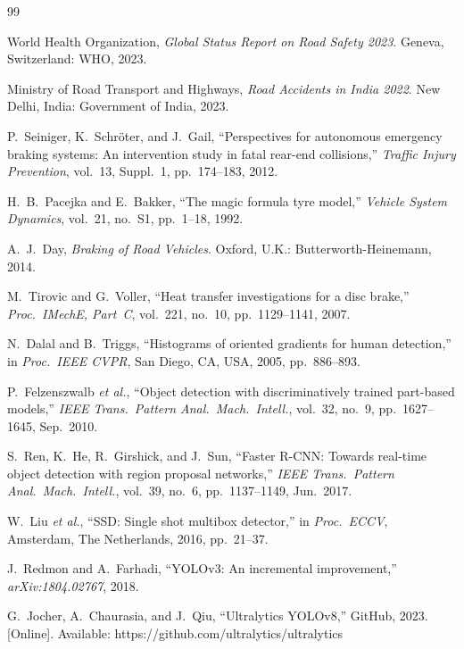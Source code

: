 \documentclass[journal]{IEEEtran}
\newcommand{\etal}{\textit{et al.}}
\begin{document}
\begin{thebibliography}{99}

World Health Organization, \textit{Global Status Report on Road Safety
2023}. Geneva, Switzerland: WHO, 2023.

Ministry of Road Transport and Highways, \textit{Road Accidents in India
2022}. New Delhi, India: Government of India, 2023.

P.~Seiniger, K.~Schr{\"o}ter, and J.~Gail,
``Perspectives for autonomous emergency braking systems: An intervention
study in fatal rear-end collisions,''
\textit{Traffic Injury Prevention}, vol.~13, Suppl.~1,
pp.~174--183, 2012.

H.~B.~Pacejka and E.~Bakker,
``The magic formula tyre model,''
\textit{Vehicle System Dynamics}, vol.~21, no.~S1, pp.~1--18, 1992.

A.~J.~Day,
\textit{Braking of Road Vehicles}.
Oxford, U.K.: Butterworth-Heinemann, 2014.

M.~Tirovic and G.~Voller,
``Heat transfer investigations for a disc brake,''
\textit{Proc.\ IMechE, Part~C}, vol.~221, no.~10,
pp.~1129--1141, 2007.

N.~Dalal and B.~Triggs,
``Histograms of oriented gradients for human detection,''
in \textit{Proc.\ IEEE CVPR}, San Diego, CA, USA, 2005, pp.~886--893.

P.~Felzenszwalb \etal,
``Object detection with discriminatively trained part-based models,''
\textit{IEEE Trans.\ Pattern Anal.\ Mach.\ Intell.}, vol.~32, no.~9,
pp.~1627--1645, Sep.~2010.

S.~Ren, K.~He, R.~Girshick, and J.~Sun,
``Faster R-CNN: Towards real-time object detection with region proposal
networks,''
\textit{IEEE Trans.\ Pattern Anal.\ Mach.\ Intell.}, vol.~39, no.~6,
pp.~1137--1149, Jun.~2017.

W.~Liu \etal,
``SSD: Single shot multibox detector,''
in \textit{Proc.\ ECCV}, Amsterdam, The Netherlands, 2016, pp.~21--37.

J.~Redmon and A.~Farhadi,
``YOLOv3: An incremental improvement,''
\textit{arXiv:1804.02767}, 2018.

G.~Jocher, A.~Chaurasia, and J.~Qiu,
``Ultralytics YOLOv8,'' GitHub, 2023. [Online].
Available: https://github.com/ultralytics/ultralytics


\end{thebibliography}
\end{document}
